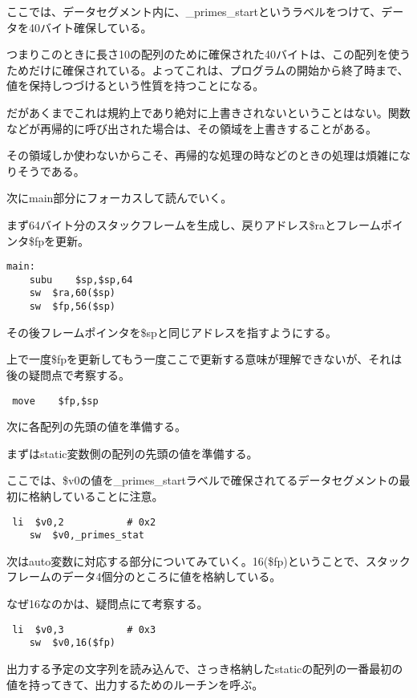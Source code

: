\documentclass[a4j]{jarticle}
\begin{document}
ここでは、データセグメント内に、\_primes\_startというラベルをつけて、データを40バイト確保している。

つまりこのときに長さ10の配列のために確保された40バイトは、この配列を使うためだけに確保されている。よってこれは、プログラムの開始から終了時まで、値を保持しつづけるという性質を持つことになる。

だがあくまでこれは規約上であり絶対に上書きされないということはない。関数などが再帰的に呼び出された場合は、その領域を上書きすることがある。

その領域しか使わないからこそ、再帰的な処理の時などのときの処理は煩雑になりそうである。


次にmain部分にフォーカスして読んでいく。

まず64バイト分のスタックフレームを生成し、戻りアドレス\$raとフレームポインタ\$fpを更新。

\begin{verbatim}
main:
    subu    $sp,$sp,64
    sw  $ra,60($sp)
    sw  $fp,56($sp)
\end{verbatim}

その後フレームポインタを\$spと同じアドレスを指すようにする。

上で一度\$fpを更新してもう一度ここで更新する意味が理解できないが、それは後の疑問点で考察する。

\begin{verbatim}
 move    $fp,$sp
\end{verbatim}

次に各配列の先頭の値を準備する。

まずはstatic変数側の配列の先頭の値を準備する。

ここでは、\$v0の値を\_primes\_startラベルで確保されてるデータセグメントの最初に格納していることに注意。


\begin{verbatim}
 li  $v0,2           # 0x2
    sw  $v0,_primes_stat
\end{verbatim}

次はauto変数に対応する部分についてみていく。16(\$fp)ということで、スタックフレームのデータ4個分のところに値を格納している。

なぜ16なのかは、疑問点にて考察する。

\begin{verbatim}
 li  $v0,3           # 0x3
    sw  $v0,16($fp)
\end{verbatim}

出力する予定の文字列を読み込んで、さっき格納したstaticの配列の一番最初の値を持ってきて、出力するためのルーチンを呼ぶ。
\end{document}
